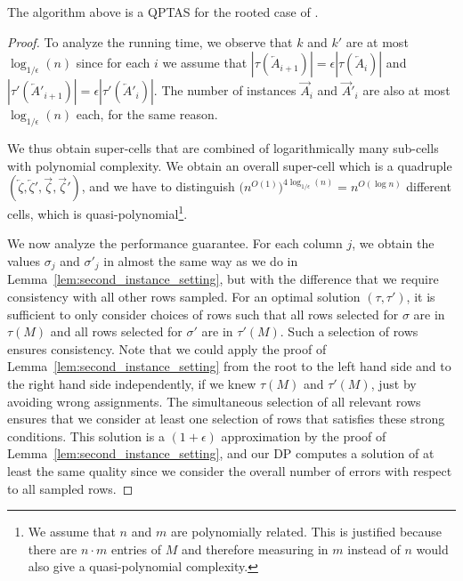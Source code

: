 \begin{lemma}\label{lem:rooted}
    The algorithm above is a QPTAS for the rooted case of \GMEC.
\end{lemma}
\begin{proof}
To analyze the running time, we observe that $k$ and $k'$ are at most $\log_{1/\epsilon}(n)$ since for each $i$ we assume that $|\tau(\overleftarrow{A}_{i+1})| =  \epsilon |\tau(\overleftarrow{A}_{i})|$
and $|\tau'(\overleftarrow{A}'_{i+1})| =  \epsilon |\tau'(\overleftarrow{A}'_{i})|$. 
The number of instances $\overrightarrow{A}_i$ and $\overrightarrow{A}'_i$ are also at most $\log_{1/\epsilon}(n)$ each, for the same reason.

We thus obtain super-cells that are combined of logarithmically many sub-cells with polynomial complexity.
We obtain an overall super-cell which is a quadruple $(\overleftarrow{\zeta},\overleftarrow{\zeta}',\overrightarrow{\zeta},\overrightarrow{\zeta}')$, and we have to distinguish $\bigl(n^{O(1)}\bigr)^{4 \log_{1/\epsilon}(n)} = n^{O(\log n)}$
different cells, which is quasi-polynomial\footnote{We assume that $n$ and $m$ are polynomially related. This is justified because there are $n \cdot m$ entries of $M$ and therefore measuring in $m$ instead of $n$ would also give a quasi-polynomial complexity.}.

We now analyze the performance guarantee. 
For each column $j$, we obtain the values $\sigma_j$ and $\sigma'_j$ in almost the same way as we do in Lemma~\ref{lem:second_instance_setting}, but with the difference that we require consistency with all other rows sampled.
For an optimal solution $(\tau,\tau')$, it is sufficient to only consider choices of rows such that all rows selected for $\sigma$ are in $\tau(M)$ and all rows selected for $\sigma'$ are in $\tau'(M)$.
Such a selection of rows ensures consistency. 
Note that we could apply the proof of Lemma~\ref{lem:second_instance_setting}  from the root to the left hand side and to the right hand side independently,
if we knew $\tau(M)$ and $\tau'(M)$, just by avoiding wrong assignments.
The simultaneous selection of all relevant rows ensures that we consider at least one selection of rows that satisfies these strong conditions.
This solution is a $(1+\epsilon)$ approximation by the proof of Lemma~\ref{lem:second_instance_setting}, and
our DP computes a solution of at least the same quality since we consider the overall number of errors with respect to all sampled rows.
\end{proof}

